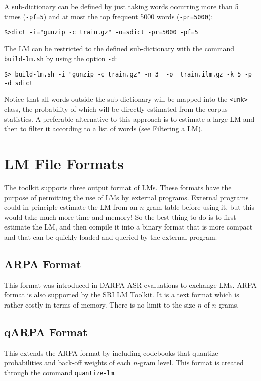 \documentclass[11pt]{article}
\begin{document}
A sub-dictionary can be defined by just taking words occurring more than 5 times ({\tt -pf=5})
and at most the top frequent 5000 words ({\tt -pr=5000}):
\begin{verbatim}
$>dict -i="gunzip -c train.gz" -o=sdict -pr=5000 -pf=5 
\end{verbatim}


\noindent
The LM can be restricted to the defined sub-dictionary with the 
command {\tt build-lm.sh} by using the option {\tt -d}: 
\begin{verbatim}
$> build-lm.sh -i "gunzip -c train.gz" -n 3  -o  train.ilm.gz -k 5 -p -d sdict 
\end{verbatim}

\noindent
Notice that all words outside the sub-dictionary will be mapped into the {\tt <unk>}
class, the probability of which will be directly estimated from the corpus statistics.
A preferable alternative to this approach is to estimate a large LM and then to filter
it according to a list of words (see Filtering a LM).


\newpage
\section{LM File Formats}
The toolkit supports three output format of LMs. These formats have the
purpose of permitting  the use of LMs by  external programs.  External
programs could in principle estimate the LM from an $n$-gram table before
using it, but this would take much more time and memory! So the best thing
to do is to first  estimate the LM, and then compile it into a binary format   
that is more compact and that can be quickly loaded and queried by the 
external program.


\subsection{ARPA Format}
This format was  introduced in DARPA ASR evaluations  to exchange LMs.
ARPA format  is also  supported by the  SRI LM  Toolkit. It is  a text
format which is rather costly in terms of memory. There is no limit to
the size $n$ of $n$-grams.

\subsection{qARPA Format}
This extends the ARPA format by including codebooks that quantize 
probabilities and back-off weights of each $n$-gram level. This format
is created through the command {\tt quantize-lm}.
\end{document}
